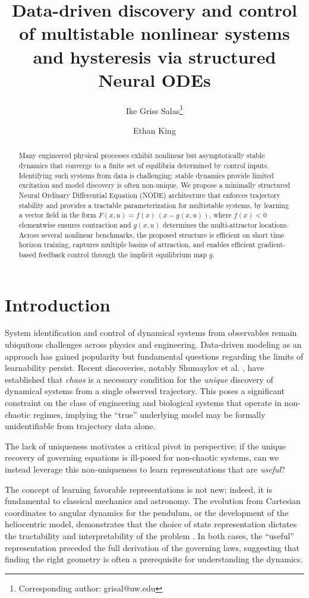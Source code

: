 \documentclass[11pt,twoside]{article}
\title{Data-driven discovery and control of multistable nonlinear systems and hysteresis via structured Neural ODEs}
\author[1]{Ike Griss Salas\thanks{Corresponding author: grisal@uw.edu}}
\author[2]{Ethan King}
\affil[1]{Department of Applied Mathematics, University of Washington, Seattle, WA, USA}
\affil[2]{Pacific Northwest National Laboratory, Richland, WA, USA}
\date{}
\theoremstyle{plain}
\theoremstyle{definition}
\theoremstyle{remark}
\begin{document}
\maketitle

\begin{abstract}
Many engineered physical processes exhibit nonlinear but asymptotically stable dynamics that converge to a finite set of equilibria determined by control inputs. Identifying such systems from data is challenging: stable dynamics provide limited excitation and model discovery is often non-unique. We propose a minimally structured Neural Ordinary Differential Equation (NODE) architecture that enforces trajectory stability and provides a tractable parameterization for multistable systems, by learning a vector field in the form \(F(x,u) = f(x)\,(x - g(x,u))\), where \(f(x) < 0\) elementwise ensures contraction and \(g(x,u)\) determines the multi-attractor locations. Across several nonlinear benchmarks, the proposed structure is efficient on short time horizon training, captures multiple basins of attraction, and enables efficient gradient-based feedback control through the implicit equilibrium map \(g\). 

\end{abstract}

\section{Introduction}
System identification and control of dynamical systems from observables remain ubiquitous challenges across physics and engineering. Data-driven modeling as an approach has gained popularity but fundamental questions regarding the limits of learnability persist. Recent discoveries, notably Shumaylov et al. \cite{shumaylov2025discoverabledatadiscoveryrequires}, have established that \emph{chaos} is a necessary condition for the \emph{unique} discovery of dynamical systems from a single observed trajectory. This poses a significant constraint on the class of engineering and biological systems that operate in non-chaotic regimes, implying the ``true'' underlying model may be formally unidentifiable from trajectory data alone.

The lack of uniqueness motivates a critical pivot in perspective: if the unique recovery of governing equations is ill-posed for non-chaotic systems, can we instead leverage this non-uniqueness to learn representations that are \emph{useful}?


The concept of learning favorable representations is not new; indeed, it is fundamental to classical mechanics and astronomy. The evolution from Cartesian coordinates to angular dynamics for the pendulum, or the development of the heliocentric model, demonstrates that the choice of state representation dictates the tractability and interpretability of the problem \cite{Goldstein2002}. In both cases, the ``useful'' representation preceded the full derivation of the governing laws, suggesting that finding the right geometry is often a prerequisite for understanding the dynamics.
\end{document}
